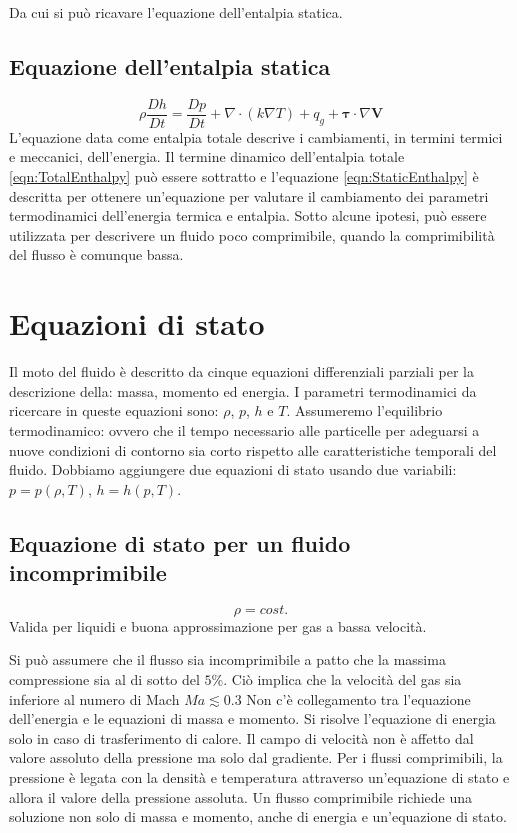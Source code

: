Da cui si può ricavare l'equazione dell'entalpia statica.

\subsection{Equazione dell'entalpia statica}
\begin{equation}
\rho \frac{Dh}{Dt} = \frac{Dp}{Dt} + \nabla \cdot (k \nabla T) + q_g + \boldsymbol{\tau} \cdot \nabla \mathbf{V}
\label{eqn:StaticEnthalpy}
\end{equation}
L'equazione data come entalpia totale descrive i cambiamenti, in termini termici e meccanici, dell'energia.
Il termine dinamico dell'entalpia totale \eqref{eqn:TotalEnthalpy} può essere sottratto e l'equazione \eqref{eqn:StaticEnthalpy} è descritta per ottenere un'equazione per valutare il cambiamento dei parametri termodinamici dell'energia termica e entalpia.
Sotto alcune ipotesi, può essere utilizzata per descrivere un fluido poco comprimibile, quando la comprimibilità del flusso è comunque bassa. 

\section{Equazioni di stato}
Il moto del fluido è descritto da cinque equazioni differenziali parziali per la descrizione della: massa, momento ed energia.
I parametri termodinamici da ricercare in queste equazioni sono: $\rho$, $p$, $h$ e $T$.
Assumeremo l'equilibrio termodinamico: ovvero che il tempo necessario alle particelle per adeguarsi a nuove condizioni di contorno sia corto rispetto alle caratteristiche temporali del fluido.
Dobbiamo aggiungere due equazioni di stato usando due variabili: $p = p(\rho, T)$, $h = h(p, T)$.

\subsection{Equazione di stato per un fluido incomprimibile}
\begin{equation}
\rho = cost.
\end{equation}
Valida per liquidi e buona approssimazione per gas a bassa velocità.

Si può assumere che il flusso sia incomprimibile a patto che la massima compressione sia al di sotto del $5\%$. Ciò implica che la velocità del gas sia inferiore al numero di Mach $ Ma \lesssim 0.3$
Non c'è collegamento tra l'equazione dell'energia e le equazioni di massa e momento. Si risolve l'equazione di energia solo in caso di trasferimento di calore.
Il campo di velocità non è affetto dal valore assoluto della pressione ma solo dal gradiente.
Per i flussi comprimibili, la pressione è legata con la densità e temperatura attraverso un'equazione di stato e allora il valore della pressione assoluta. Un flusso comprimibile richiede una soluzione non solo di massa e momento, anche di energia e un'equazione di stato.

